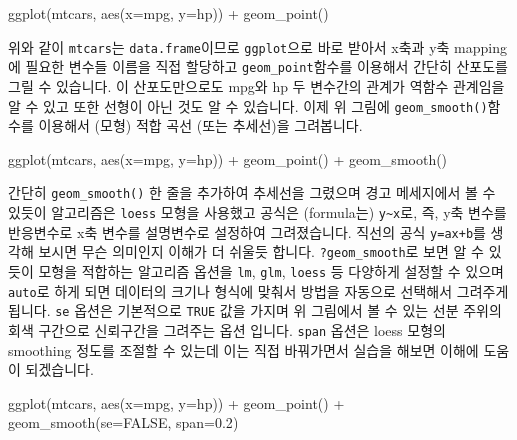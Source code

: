 \documentclass[
]{book}
\newenvironment{Shaded}{\begin{snugshade}}{\end{snugshade}}
\newcommand{\AttributeTok}[1]{\textcolor[rgb]{0.77,0.63,0.00}{#1}}
\newcommand{\ConstantTok}[1]{\textcolor[rgb]{0.00,0.00,0.00}{#1}}
\newcommand{\FloatTok}[1]{\textcolor[rgb]{0.00,0.00,0.81}{#1}}
\newcommand{\FunctionTok}[1]{\textcolor[rgb]{0.00,0.00,0.00}{#1}}
\newcommand{\NormalTok}[1]{#1}
\newcommand{\SpecialCharTok}[1]{\textcolor[rgb]{0.00,0.00,0.00}{#1}}
\begin{document}
\begin{Shaded}
\begin{Highlighting}[]
\FunctionTok{ggplot}\NormalTok{(mtcars, }\FunctionTok{aes}\NormalTok{(}\AttributeTok{x=}\NormalTok{mpg, }\AttributeTok{y=}\NormalTok{hp)) }\SpecialCharTok{+}
  \FunctionTok{geom\_point}\NormalTok{()}
\end{Highlighting}
\end{Shaded}

위와 같이 \texttt{mtcars}는 \texttt{data.frame}이므로 \texttt{ggplot}으로 바로 받아서 x축과 y축 mapping에 필요한 변수들 이름을 직접 할당하고 \texttt{geom\_point}함수를 이용해서 간단히 산포도를 그릴 수 있습니다. 이 산포도만으로도 mpg와 hp 두 변수간의 관계가 역함수 관계임을 알 수 있고 또한 선형이 아닌 것도 알 수 있습니다. 이제 위 그림에 \texttt{geom\_smooth()}함수를 이용해서 (모형) 적합 곡선 (또는 추세선)을 그려봅니다.

\begin{Shaded}
\begin{Highlighting}[]
\FunctionTok{ggplot}\NormalTok{(mtcars, }\FunctionTok{aes}\NormalTok{(}\AttributeTok{x=}\NormalTok{mpg, }\AttributeTok{y=}\NormalTok{hp)) }\SpecialCharTok{+}
  \FunctionTok{geom\_point}\NormalTok{() }\SpecialCharTok{+}
  \FunctionTok{geom\_smooth}\NormalTok{()}
\end{Highlighting}
\end{Shaded}

간단히 \texttt{geom\_smooth()} 한 줄을 추가하여 추세선을 그렸으며 경고 메세지에서 볼 수 있듯이 알고리즘은 \texttt{loess} 모형을 사용했고 공식은 (formula는) \texttt{y\textasciitilde{}x}로, 즉, y축 변수를 반응변수로 x축 변수를 설명변수로 설정하여 그려졌습니다. 직선의 공식 \texttt{y=ax+b}를 생각해 보시면 무슨 의미인지 이해가 더 쉬울듯 합니다. \texttt{?geom\_smooth}로 보면 알 수 있듯이 모형을 적합하는 알고리즘 옵션을 \texttt{lm}, \texttt{glm}, \texttt{loess} 등 다양하게 설정할 수 있으며 \texttt{auto}로 하게 되면 데이터의 크기나 형식에 맞춰서 방법을 자동으로 선택해서 그려주게 됩니다. \texttt{se} 옵션은 기본적으로 \texttt{TRUE} 값을 가지며 위 그림에서 볼 수 있는 선분 주위의 회색 구간으로 신뢰구간을 그려주는 옵션 입니다. \texttt{span} 옵션은 loess 모형의 smoothing 정도를 조절할 수 있는데 이는 직접 바꿔가면서 실습을 해보면 이해에 도움이 되겠습니다.

\begin{Shaded}
\begin{Highlighting}[]
\FunctionTok{ggplot}\NormalTok{(mtcars, }\FunctionTok{aes}\NormalTok{(}\AttributeTok{x=}\NormalTok{mpg, }\AttributeTok{y=}\NormalTok{hp)) }\SpecialCharTok{+}
  \FunctionTok{geom\_point}\NormalTok{() }\SpecialCharTok{+}
  \FunctionTok{geom\_smooth}\NormalTok{(}\AttributeTok{se=}\ConstantTok{FALSE}\NormalTok{, }\AttributeTok{span=}\FloatTok{0.2}\NormalTok{)}
\end{Highlighting}
\end{Shaded}
\end{document}
